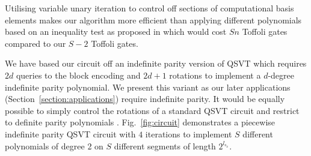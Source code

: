 \documentclass[aps,prx,twocolumn,floatfix,10pt,amssymb,amsfont,amsmath,superscriptaddress,float,nofootinbib,longbibliography,nobalancelastpage]{revtex4-2}
\theoremstyle{empty}
\begin{document}
Utilising variable unary iteration to control off sections of computational basis elements makes our algorithm more efficient than applying different polynomials based on an inequality test as proposed in \cite{mcardleQuantumStatePreparation2022} which would cost $Sn$ Toffoli gates compared to our $S-2$ Toffoli gates.

We have based our circuit off an indefinite parity version of QSVT \cite{sunderhauf2023generalizedquantumsingularvalue} which requires $2d$ queries to the block encoding and $2d + 1$ rotations to implement a $d$-degree indefinite parity polynomial. We present this variant as our later applications (Section~\ref{section:applications}) require indefinite parity. It would be equally possible to simply control the rotations of a standard QSVT circuit and restrict to definite parity polynomials \footnotemark[1].
Fig.~\ref{fig:circuit} demonstrates a piecewise indefinite parity QSVT circuit with $4$ iterations to implement $S$ different polynomials of degree 2 on $S$ different segments of length $2^{l_{s_x}}$.
\end{document}
